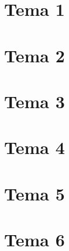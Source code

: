 \section{Tema 1}

\section{Tema 2}

\section{Tema 3}

\section{Tema 4}

\section{Tema 5}

\section{Tema 6}